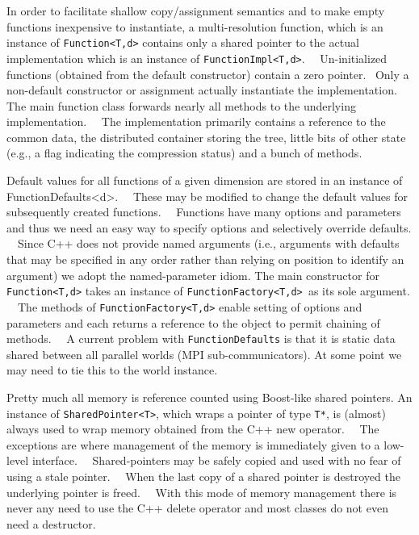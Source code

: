 \documentclass[letterpaper]{article}
\begin{document}
In order to facilitate shallow copy/assignment semantics and to make empty functions inexpensive to instantiate, a
multi-resolution function, which is an instance of \texttt{Function{\textless}T,d{\textgreater}} contains only a shared
pointer to the actual implementation which is an instance of \texttt{FunctionImpl{\textless}T,d{\textgreater}}.
\ \ Un-initialized functions (obtained from the default constructor) contain a zero pointer. \ Only a non-default
constructor or assignment actually instantiate the implementation. The main function class forwards nearly all methods
to the underlying implementation. \ \ The implementation primarily contains a reference to the common data, the
distributed container storing the tree, little bits of other state (e.g., a flag indicating the compression status) and
a bunch of methods.

Default values for all functions of a given dimension are stored in an instance of
FunctionDefaults{\textless}d{\textgreater}. \ \ These may be modified to change the default values for subsequently
created functions. \ \ Functions have many options and parameters and thus we need an easy way to specify options and
selectively override defaults. \ \ Since C++ does not provide named arguments (i.e., arguments with defaults that may
be specified in any order rather than relying on position to identify an argument) we adopt the named-parameter idiom.
The main constructor for \texttt{Function{\textless}T,d{\textgreater}} takes an instance of
\texttt{FunctionFactory{\textless}T,d{\textgreater} }as its sole argument. \ \ The methods of
\texttt{FunctionFactory{\textless}T,d{\textgreater}} enable setting of options and parameters and each returns a
reference to the object to permit chaining of methods. \ \ A current problem with \texttt{FunctionDefaults} is that it
is static data shared between all parallel worlds (MPI sub-communicators). At some point we may need to tie this to the
world instance.

Pretty much all memory is reference counted using Boost-like shared pointers. An instance of
\texttt{SharedPointer{\textless}T{\textgreater}}, which wraps a pointer of type \texttt{T*}, is (almost) always used to
wrap memory obtained from the C++ new operator. \ \ The exceptions are where management of the memory is immediately
given to a low-level interface. \ \ Shared-pointers may be safely copied and used with no fear of using a stale
pointer. \ \ When the last copy of a shared pointer is destroyed the underlying pointer is freed. \ \ With this mode of
memory management there is never any need to use the C++ delete operator and most classes do not even need a
destructor.
\end{document}
